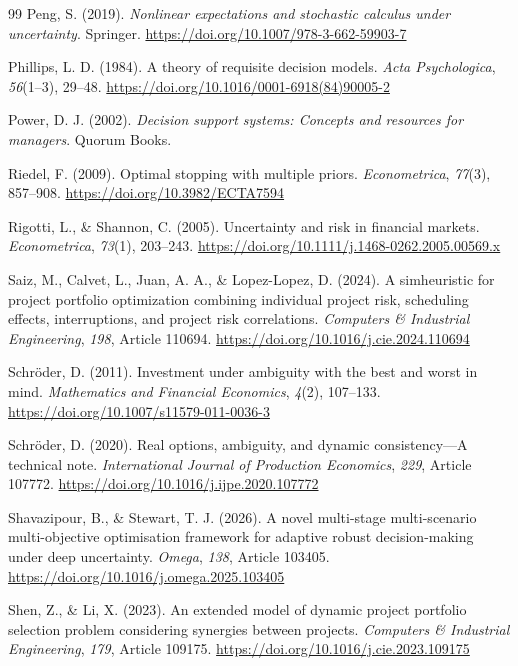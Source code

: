 \begin{thebibliography}{99}
Peng, S. (2019). \emph{Nonlinear expectations and stochastic calculus under uncertainty}. Springer. \url{https://doi.org/10.1007/978-3-662-59903-7}

Phillips, L. D. (1984). A theory of requisite decision models. \emph{Acta Psychologica}, \emph{56}(1--3), 29--48. \url{https://doi.org/10.1016/0001-6918(84)90005-2}

Power, D. J. (2002). \emph{Decision support systems: Concepts and resources for managers}. Quorum Books.

Riedel, F. (2009). Optimal stopping with multiple priors. \emph{Econometrica}, \emph{77}(3), 857--908. \url{https://doi.org/10.3982/ECTA7594}

Rigotti, L., \& Shannon, C. (2005). Uncertainty and risk in financial markets. \emph{Econometrica}, \emph{73}(1), 203--243. \url{https://doi.org/10.1111/j.1468-0262.2005.00569.x}

Saiz, M., Calvet, L., Juan, A. A., \& Lopez-Lopez, D. (2024). A simheuristic for project portfolio optimization combining individual project risk, scheduling effects, interruptions, and project risk correlations. \emph{Computers \& Industrial Engineering}, \emph{198}, Article 110694. \url{https://doi.org/10.1016/j.cie.2024.110694}

Schr\"oder, D. (2011). Investment under ambiguity with the best and worst in mind. \emph{Mathematics and Financial Economics}, \emph{4}(2), 107--133. \url{https://doi.org/10.1007/s11579-011-0036-3}

Schr\"oder, D. (2020). Real options, ambiguity, and dynamic consistency---A technical note. \emph{International Journal of Production Economics}, \emph{229}, Article 107772. \url{https://doi.org/10.1016/j.ijpe.2020.107772}

Shavazipour, B., \& Stewart, T. J. (2026). A novel multi-stage multi-scenario multi-objective optimisation framework for adaptive robust decision-making under deep uncertainty. \emph{Omega}, \emph{138}, Article 103405. \url{https://doi.org/10.1016/j.omega.2025.103405}

Shen, Z., \& Li, X. (2023). An extended model of dynamic project portfolio selection problem considering synergies between projects. \emph{Computers \& Industrial Engineering}, \emph{179}, Article 109175. \url{https://doi.org/10.1016/j.cie.2023.109175}


\end{thebibliography}
